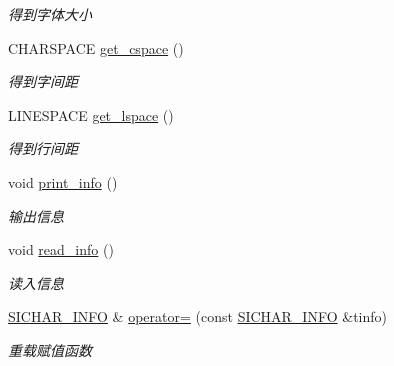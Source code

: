 \begin{DoxyCompactItemize}
\begin{DoxyCompactList}\small\item\em 得到字体大小~\newline
\end{DoxyCompactList}\item 
C\+H\+A\+R\+S\+P\+A\+CE \hyperlink{class_s_i_c_h_a_r___i_n_f_o_af170e524f63209016d06f919dd4c33d3}{get\+\_\+cspace} ()
\begin{DoxyCompactList}\small\item\em 得到字间距~\newline
\end{DoxyCompactList}\item 
L\+I\+N\+E\+S\+P\+A\+CE \hyperlink{class_s_i_c_h_a_r___i_n_f_o_a212cea0692a8717d5b671035885796c2}{get\+\_\+lspace} ()
\begin{DoxyCompactList}\small\item\em 得到行间距~\newline
\end{DoxyCompactList}\item 
\mbox{\label{class_s_i_c_h_a_r___i_n_f_o_afa85ade3f4a994f8454f835fe9c05a9e}} 
void \hyperlink{class_s_i_c_h_a_r___i_n_f_o_afa85ade3f4a994f8454f835fe9c05a9e}{print\+\_\+info} ()
\begin{DoxyCompactList}\small\item\em 输出信息 \end{DoxyCompactList}\item 
\mbox{\label{class_s_i_c_h_a_r___i_n_f_o_a762bed1602c6c28fbfda1bb1d29d7dff}} 
void \hyperlink{class_s_i_c_h_a_r___i_n_f_o_a762bed1602c6c28fbfda1bb1d29d7dff}{read\+\_\+info} ()
\begin{DoxyCompactList}\small\item\em 读入信息 \end{DoxyCompactList}\item 
\hyperlink{class_s_i_c_h_a_r___i_n_f_o}{S\+I\+C\+H\+A\+R\+\_\+\+I\+N\+FO} \& \hyperlink{class_s_i_c_h_a_r___i_n_f_o_a3083fe977f3675c45f0da8e9c38a399c}{operator=} (const \hyperlink{class_s_i_c_h_a_r___i_n_f_o}{S\+I\+C\+H\+A\+R\+\_\+\+I\+N\+FO} \&tinfo)
\begin{DoxyCompactList}\small\item\em 重载赋值函数~\newline
\end{DoxyCompactList}\end{DoxyCompactItemize}
